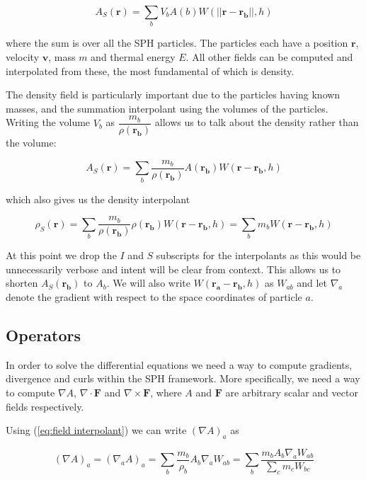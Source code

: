 \documentclass[../main.tex]{subfiles}
\begin{document}
\begin{equation}
    A_S(\bm{r})
    = \sum_{b} V_b A(b) W(||\bm{r} - \bm{r_b}||, h)
\end{equation}

where the sum is over all the SPH particles. The particles each have a position $\bm{r}$, velocity
$\bm{v}$, mass $m$ and thermal energy $E$. All other fields can be computed and interpolated
from these, the most fundamental of which is density.

The density field is particularly important due to the particles having known masses, and the
summation interpolant using the volumes of the particles. Writing the volume $V_b$ as
$\dfrac{m_b}{\rho(\bm{r_b})}$ allows us to talk about the density rather than the volume:

\begin{equation} \label{eq:field interpolant}
    A_S(\bm{r})
    = \sum_{b} \frac{m_b}{\rho(\bm{r_b})} A(\bm{r_b}) W(\bm{r} - \bm{r_b}, h)
\end{equation}

which also gives us the density interpolant

\begin{equation}
    \rho_S(\bm{r})
    = \sum_{b} \frac{m_b}{\rho(\bm{r_b})} \rho(\bm{r_b}) W(\bm{r} - \bm{r_b}, h)
    = \sum_{b} m_b W(\bm{r} - \bm{r_b}, h)
\end{equation}

At this point we drop the $I$ and $S$ subscripts for the interpolants as this would be
unnecessarily verbose and intent will be clear from context. This allows us to shorten
$A_S(\bm{r_b})$ to $A_b$. We will also write $W(\bm{r_a} - \bm{r_b}, h)$ as $W_{ab}$ and let
$\nabla_a$ denote the gradient with respect to the space coordinates of particle $a$.

\subsection{Operators}
In order to solve the differential equations we need a way to compute gradients, divergence and
curls within the SPH framework. More specifically, we need a way to compute
$\nabla A$, $\nabla\cdot\bm{F}$ and $\nabla\times\bm{F}$, where $A$ and $\bm{F}$ are arbitrary
scalar and vector fields respectively.

Using (\ref{eq:field interpolant}) we can write $(\nabla A)_a$ as

\begin{equation} \label{eq:naive gradient}
    (\nabla A)_a
    = (\nabla_a A)_a
    = \sum_b \frac{m_b}{\rho_b} A_b \nabla_a W_{ab}
    = \sum_b \frac{m_b A_b \nabla_a W_{ab}}{\sum_c m_c W_{bc}}
\end{equation}
\end{document}
